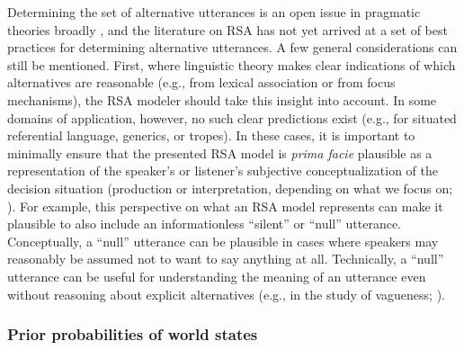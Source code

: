\documentclass[10pt,letterpaper]{article}
\begin{document}
Determining the set of alternative utterances is an open issue in pragmatic theories broadly \cite{ChemlaSingh2014:Remarks-on-the-,Katzir2007:Structurally-De,FoxKatzir2011:On-the-Characte}, and the literature on RSA has not yet arrived at a set of best practices for determining alternative utterances.
A few general considerations can still be mentioned.
First, where linguistic theory makes clear indications of which alternatives are reasonable (e.g., from lexical association or from focus mechanisms), the RSA modeler should take this insight into account.
In some domains of application, however, no such clear predictions exist (e.g., for situated referential language, generics, or tropes).
In these cases, it is important to minimally ensure that the presented RSA model is \emph{prima facie} plausible as a representation of the speaker's or listener's subjective conceptualization of the decision situation (production or interpretation, depending on what we focus on; \cite{Franke2012:Pragmatic-Reaso}).
For example, this perspective on what an RSA model represents can make it plausible to also include an informationless ``silent'' or ``null'' utterance.
Conceptually, a ``null'' utterance can be plausible in cases where speakers may reasonably be assumed not to want to say anything at all.
Technically, a ``null'' utterance can be useful for understanding the meaning of an utterance even without reasoning about explicit alternatives (e.g., in the study of vagueness; \cite{lassitergoodman2013}).


\subsubsection*{Prior probabilities of world states}
\end{document}

